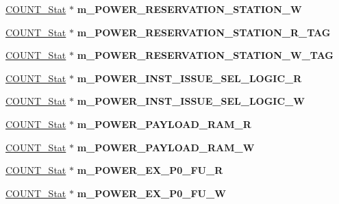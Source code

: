 \begin{DoxyCompactItemize}
\item 
\hypertarget{classall__stats__c_a56a2efc4119082a12bcecd5346a9940c}{
\hyperlink{classCOUNT__Stat}{COUNT\_\-Stat} $\ast$ {\bfseries m\_\-POWER\_\-RESERVATION\_\-STATION\_\-W}}
\label{classall__stats__c_a56a2efc4119082a12bcecd5346a9940c}

\item 
\hypertarget{classall__stats__c_a570958203db7629cad403f4d1093d6cf}{
\hyperlink{classCOUNT__Stat}{COUNT\_\-Stat} $\ast$ {\bfseries m\_\-POWER\_\-RESERVATION\_\-STATION\_\-R\_\-TAG}}
\label{classall__stats__c_a570958203db7629cad403f4d1093d6cf}

\item 
\hypertarget{classall__stats__c_aef3989b4f52c899b3e0569c7d758aeec}{
\hyperlink{classCOUNT__Stat}{COUNT\_\-Stat} $\ast$ {\bfseries m\_\-POWER\_\-RESERVATION\_\-STATION\_\-W\_\-TAG}}
\label{classall__stats__c_aef3989b4f52c899b3e0569c7d758aeec}

\item 
\hypertarget{classall__stats__c_a1bc53f279d60453b0b1faeeababa418f}{
\hyperlink{classCOUNT__Stat}{COUNT\_\-Stat} $\ast$ {\bfseries m\_\-POWER\_\-INST\_\-ISSUE\_\-SEL\_\-LOGIC\_\-R}}
\label{classall__stats__c_a1bc53f279d60453b0b1faeeababa418f}

\item 
\hypertarget{classall__stats__c_aa31395200f03e94ad65f85c3a54c9a33}{
\hyperlink{classCOUNT__Stat}{COUNT\_\-Stat} $\ast$ {\bfseries m\_\-POWER\_\-INST\_\-ISSUE\_\-SEL\_\-LOGIC\_\-W}}
\label{classall__stats__c_aa31395200f03e94ad65f85c3a54c9a33}

\item 
\hypertarget{classall__stats__c_aff718ff5354f6644a49b101c3e13ad0a}{
\hyperlink{classCOUNT__Stat}{COUNT\_\-Stat} $\ast$ {\bfseries m\_\-POWER\_\-PAYLOAD\_\-RAM\_\-R}}
\label{classall__stats__c_aff718ff5354f6644a49b101c3e13ad0a}

\item 
\hypertarget{classall__stats__c_ad31f85a9e37177e84c14121bd7f1b9ee}{
\hyperlink{classCOUNT__Stat}{COUNT\_\-Stat} $\ast$ {\bfseries m\_\-POWER\_\-PAYLOAD\_\-RAM\_\-W}}
\label{classall__stats__c_ad31f85a9e37177e84c14121bd7f1b9ee}

\item 
\hypertarget{classall__stats__c_ab815a2ae2e0cd76fa81c97b3192668df}{
\hyperlink{classCOUNT__Stat}{COUNT\_\-Stat} $\ast$ {\bfseries m\_\-POWER\_\-EX\_\-P0\_\-FU\_\-R}}
\label{classall__stats__c_ab815a2ae2e0cd76fa81c97b3192668df}

\item 
\hypertarget{classall__stats__c_aed0db5afbc3bea5f421de32a0cbcf42f}{
\hyperlink{classCOUNT__Stat}{COUNT\_\-Stat} $\ast$ {\bfseries m\_\-POWER\_\-EX\_\-P0\_\-FU\_\-W}}
\label{classall__stats__c_aed0db5afbc3bea5f421de32a0cbcf42f}


\end{DoxyCompactItemize}
